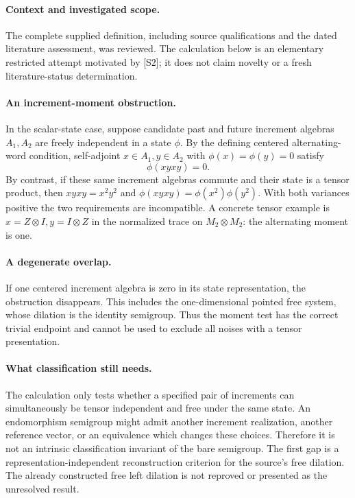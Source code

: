 \documentclass[11pt]{article}
\begin{document}
\paragraph{Context and investigated scope.} The complete supplied definition, including source qualifications and the dated literature assessment, was reviewed. The calculation below is an elementary restricted attempt motivated by [S2]; it does not claim novelty or a fresh literature-status determination.

\paragraph{An increment-moment obstruction.} In the scalar-state case, suppose candidate past and future increment algebras $A_1,A_2$ are freely independent in a state $\phi$. By the defining centered alternating-word condition, self-adjoint $x\in A_1,y\in A_2$ with $\phi(x)=\phi(y)=0$ satisfy
\[
 \phi(xyxy)=0.
\]
By contrast, if these same increment algebras commute and their state is a tensor product, then $xyxy=x^2y^2$ and $\phi(xyxy)=\phi(x^2)\phi(y^2)$. With both variances positive the two requirements are incompatible. A concrete tensor example is $x=Z\otimes I,y=I\otimes Z$ in the normalized trace on $M_2\otimes M_2$: the alternating moment is one.

\paragraph{A degenerate overlap.} If one centered increment algebra is zero in its state representation, the obstruction disappears. This includes the one-dimensional pointed free system, whose dilation is the identity semigroup. Thus the moment test has the correct trivial endpoint and cannot be used to exclude all noises with a tensor presentation.

\paragraph{What classification still needs.} The calculation only tests whether a specified pair of increments can simultaneously be tensor independent and free under the same state. An endomorphism semigroup might admit another increment realization, another reference vector, or an equivalence which changes these choices. Therefore it is not an intrinsic classification invariant of the bare semigroup. The first gap is a representation-independent reconstruction criterion for the source's free dilation. The already constructed free left dilation is not reproved or presented as the unresolved result.
\end{document}
